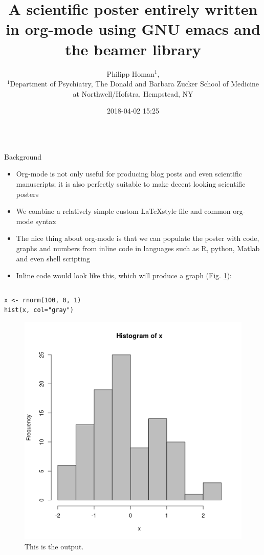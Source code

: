 \documentclass[final]{beamer}
\date{}
\author{
Philipp Homan$^{1}$,
\\
\normalsize{$^{1}$Department of Psychiatry,}
\normalsize{The Donald and Barbara Zucker}
\normalsize{School of Medicine at Northwell/Hofstra,}
\normalsize{Hempstead, NY}
}
\date{2018-04-02 15:25}
\title{A scientific poster entirely written in org-mode using GNU emacs and the beamer library}
\begin{document}
\begin{frame}[fragile,label={sec:orga07b5dd}]{}
 \begin{columns}
\begin{column}[t]{0.45\columnwidth}
\begin{block}{Background}
\begin{itemize}
\item Org-mode is not only useful for producing blog posts and even
scientific manuscripts; it is also perfectly suitable to make 
decent looking scientific posters
\item We combine a relatively simple custom \LaTeX style file and common
org-mode syntax
\item The nice thing about org-mode is that we can populate the poster with
code, graphs and numbers from inline code in languages such as R,
python, Matlab and even shell scripting
\item Inline code would look like this, which will produce a graph
(Fig. \ref{fig:orgfe25245}):
\end{itemize}

\begin{columns}
\begin{column}[T]{0.48\columnwidth}
\begin{verbatim}
x <- rnorm(100, 0, 1)
hist(x, col="gray")
\end{verbatim}


\begin{figure}[htbp]
\centering
\includegraphics[width=.9\linewidth]{3.png}
\caption{\label{fig:orgfe25245}
This is the output.}
\end{figure}
\end{column}
\end{columns}
\end{block}


\end{column}
\end{columns}
\end{frame}
\end{document}
